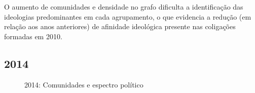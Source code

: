 O aumento de comunidades e densidade no grafo dificulta a identificação das ideologias predominantes em cada agrupamento, o que evidencia a redução (em relação aos anos anteriores) de afinidade ideológica presente nas coligações formadas em 2010.

\subsection{2014}
\label{resultados__grafos--2014}

\begin{figure}[H]
\center
    \qquad
    
    \caption{2014: Comunidades e espectro político}
\end{figure}

